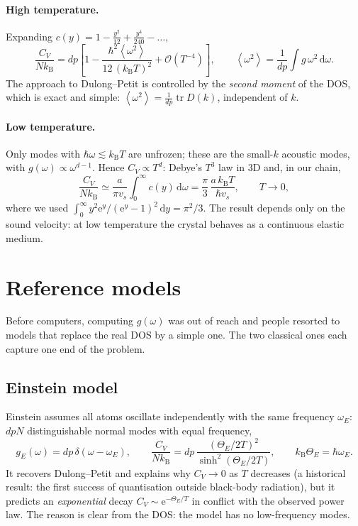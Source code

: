 \documentclass[11pt,a4paper]{article}
\newcommand{\kB}{k_{\mathrm B}}
\newcommand{\dd}{\mathrm{d}}
\newcommand{\ee}{\mathrm{e}}
\newcommand{\avg}[1]{\left\langle #1\right\rangle}
\newcommand{\vs}{v_{s}}
\begin{document}
\paragraph{High temperature.} Expanding $c(y)=1-\frac{y^2}{12}+\frac{y^4}{240}-\dots$,
\begin{equation}
\frac{C_V}{N\kB}= dp\left[1-\frac{\hbar^2\avg{\omega^2}}{12\,(\kB T)^2}+\mathcal O(T^{-4})\right],
\qquad \avg{\omega^2}=\frac{1}{dp}\int g\,\omega^2\,\dd\omega .
\label{eq:highT}
\end{equation}
The approach to Dulong–Petit is controlled by the \emph{second moment} of the
DOS, which is exact and simple: $\avg{\omega^2}=\frac{1}{dp}\operatorname{tr}D(k)$,
independent of $k$.

\paragraph{Low temperature.} Only modes with $\hbar\omega\lesssim\kB T$ are
unfrozen; these are the small-$k$ acoustic modes, with $g(\omega)\propto
\omega^{d-1}$. Hence $C_V\propto T^d$: Debye's $T^3$ law in 3D and, in our
chain,
\begin{equation}
\frac{C_V}{N\kB}\simeq \frac{a}{\pi\vs}\int_0^\infty c(y)\,\dd\omega
=\frac{\pi}{3}\,\frac{a\,\kB T}{\hbar \vs},
\qquad T\to0,
\label{eq:lowT}
\end{equation}
where we used $\int_0^\infty y^2\ee^y/(\ee^y-1)^2\,\dd y=\pi^2/3$. The result
depends only on the sound velocity: at low temperature the crystal behaves as a
continuous elastic medium.

\section{Reference models}\label{sec:modelos}

Before computers, computing $g(\omega)$ was out of reach and people resorted to
models that replace the real DOS by a simple one. The two classical ones each
capture one end of the problem.

\subsection{Einstein model}

Einstein assumes all atoms oscillate independently with the same frequency
$\omega_E$: $dpN$ distinguishable normal modes with equal frequency,
\begin{equation}
g_E(\omega)=dp\,\delta(\omega-\omega_E),\qquad
\frac{C_V}{N\kB}=dp\,\frac{(\Theta_E/2T)^2}{\sinh^2(\Theta_E/2T)},\qquad
\kB\Theta_E=\hbar\omega_E .
\end{equation}
It recovers Dulong–Petit and explains why $C_V\to0$ as $T$ decreases (a
historical result: the first success of quantisation outside black-body
radiation), but it predicts an \emph{exponential} decay $C_V\sim
\ee^{-\Theta_E/T}$ in conflict with the observed power law. The reason is clear
from the DOS: the model has no low-frequency modes.
\end{document}
